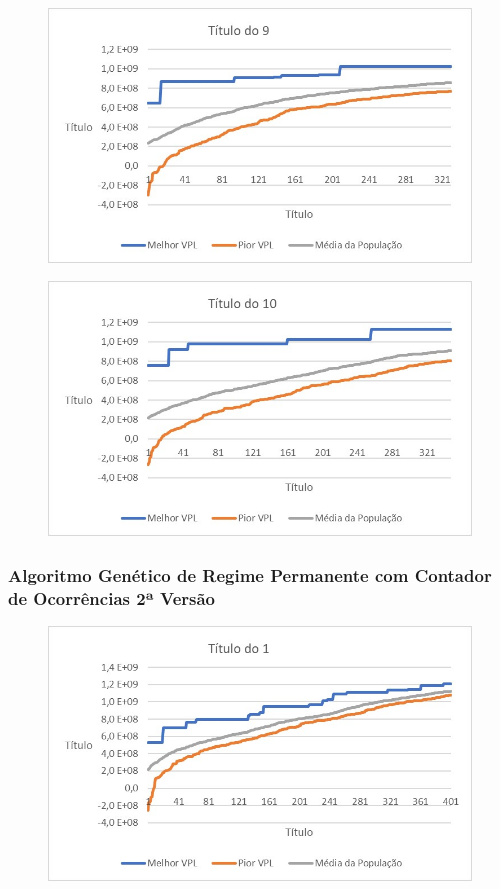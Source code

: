 \documentclass[12pt,a4paper]{report}
\begin{document}
\begin{figure}[H]
\centering

\includegraphics[scale=1]{ApE/AGRPCO1/9}

\end{figure}
\begin{figure}[H]
\centering

\includegraphics[scale=1]{ApE/AGRPCO1/10}

\end{figure}

\subsubsection{Algoritmo Genético de Regime Permanente com Contador de Ocorrências 2ª Versão}


\begin{figure}[H]
\centering

\includegraphics[scale=1]{ApE/AGRPCO2/1}

\end{figure}
\end{document}
